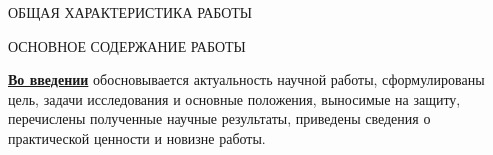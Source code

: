 \documentclass[a4paper,14pt]{report}
\theoremstyle{plain}
\theoremstyle{break}
\begin{document}



\begin{center}
ОБЩАЯ ХАРАКТЕРИСТИКА РАБОТЫ
\end{center}



\begin{center}
ОСНОВНОЕ СОДЕРЖАНИЕ РАБОТЫ
\end{center}

{\underline {\bf Во введении}} обосновывается актуальность научной работы,
сформулированы цель, задачи исследования и основные положения, выносимые на
защиту,
перечислены полученные научные результаты, приведены
сведения о практической ценности и новизне работы.\\






\end{document}
